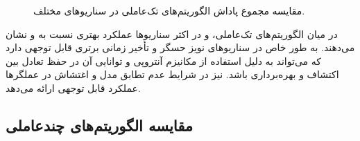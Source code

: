 \begin{figure}[H]
	\caption{مقایسه مجموع پاداش الگوریتم‌های تک‌عاملی در سناریوهای مختلف.}
	\label{fig:all_solo_robustness_violin}
\end{figure}

در میان الگوریتم‌های تک‌عاملی،  و  در اکثر سناریوها عملکرد بهتری نسبت به  و  نشان می‌دهند.  به طور خاص در سناریوهای نویز حسگر و تأخیر زمانی برتری قابل توجهی دارد که می‌تواند به دلیل استفاده از مکانیزم آنتروپی و توانایی آن در حفظ تعادل بین اکتشاف و بهره‌برداری باشد.  نیز در شرایط عدم تطابق مدل و اغتشاش در عملگرها عملکرد قابل توجهی ارائه می‌دهد.

\subsection{مقایسه الگوریتم‌های چندعاملی}

